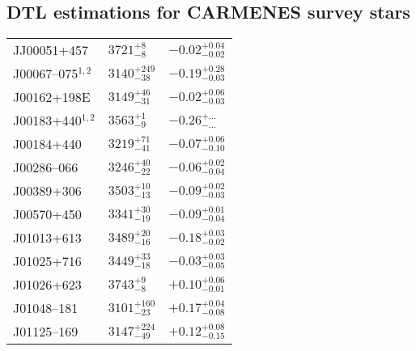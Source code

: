 \documentclass{aa}
\begin{document}



\begin{appendix}
\section{DTL estimations for CARMENES survey stars}
\tablelasttail{
\bottomrule {}
}
\setlength{\extrarowheight}{3pt}
\begin{center}
\begin{xtabular}{lll}
\label{tab:teff_zeta_carm}
JJ00051+457 & $3721_{-8}^{+8}$ & $-0.02_{-0.02}^{+0.04}$ \\
J00067--075$^{1,2}$ & $3140_{-38}^{+249}$ & $-0.19_{-0.03}^{+0.28}$ \\
J00162+198E & $3149_{-31}^{+46}$ & $-0.02_{-0.03}^{+0.06}$ \\
J00183+440$^{1,2}$ & $3563_{-9}^{+1}$ & $-0.26_{-...}^{+...}$ \\
J00184+440 & $3219_{-41}^{+71}$ & $-0.07_{-0.10}^{+0.06}$ \\
J00286--066 & $3246_{-22}^{+40}$ & $-0.06_{-0.04}^{+0.02}$ \\
J00389+306 & $3503_{-13}^{+10}$ & $-0.09_{-0.03}^{+0.02}$ \\
J00570+450 & $3341_{-19}^{+30}$ & $-0.09_{-0.04}^{+0.01}$ \\
J01013+613 & $3489_{-16}^{+20}$ & $-0.18_{-0.02}^{+0.03}$ \\
J01025+716 & $3449_{-18}^{+33}$ & $-0.03_{-0.05}^{+0.03}$ \\
J01026+623 & $3743_{-8}^{+9}$ & $+0.10_{-0.01}^{+0.06}$ \\
J01048--181 & $3101_{-23}^{+160}$ & $+0.17_{-0.08}^{+0.04}$ \\
J01125--169 & $3147_{-49}^{+224}$ & $+0.12_{-0.15}^{+0.08}$ \\

\end{xtabular}
\end{center}
\end{appendix}
\end{document}
